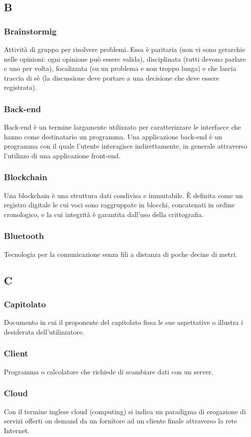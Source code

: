 \subsection*{B}
\subsubsection*{Brainstormig} Attività di gruppo per risolvere problemi. Essa è paritaria (non vi sono gerarchie nelle opinioni: ogni opinione può essere valida), disciplinata (tutti devono parlare e uno per volta), focalizzata (su un problema e non troppo lunga) e che lascia traccia di sè (la discussione deve portare a una decisione che deve essere registrata).
\subsubsection*{Back-end} Back-end è un termine largamente utilizzato per caratterizzare le interfacce che hanno come destinatario un programma. Una applicazione back-end è un programma con il quale l'utente interagisce indirettamente, in generale attraverso l'utilizzo di una applicazione front-end.
\subsubsection*{Blockchain} Una blockchain è una struttura dati condivisa e immutabile. È definita come un registro
digitale le cui voci sono raggruppate in blocchi, concatenati in ordine cronologico, e la cui integrità è garantita dall'uso della crittografia.
\subsubsection*{Bluetooth} Tecnologia per la comunicazione senza fili a distanza di poche decine di metri.
\subsection*{C}
\subsubsection*{Capitolato} Documento in cui il proponente del capitolato fissa le sue aspettative o illustra i desiderata dell'utilizzatore.
\subsubsection*{Client} Programma o calcolatore che richiede di scambiare dati con un server.
\subsubsection*{Cloud} Con il termine inglese cloud (computing) si indica un paradigma di erogazione di servizi offerti on demand da un fornitore ad un cliente finale attraverso la rete Internet.

